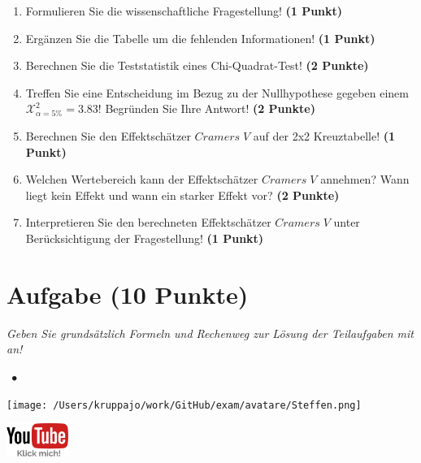 \documentclass[a4paper, 9pt]{scrartcl}\usepackage[]{graphicx}\usepackage[]{xcolor}
\begin{document}
\begin{enumerate}
\item Formulieren Sie die wissenschaftliche Fragestellung! \textbf{(1 Punkt)}
\item Ergänzen Sie die Tabelle um die fehlenden Informationen! \textbf{(1 Punkt)} 
\item Berechnen Sie die Teststatistik eines Chi-Quadrat-Test! \textbf{(2 Punkte)}
\item Treffen Sie eine Entscheidung im Bezug zu der Nullhypothese gegeben
  einem $\mathcal{X}^2_{\alpha = 5\%} = 3.83$! Begründen Sie Ihre Antwort!
  \textbf{(2 Punkte)}
\item Berechnen Sie den Effektschätzer $Cramers\; V$ auf der 2x2 Kreuztabelle! \textbf{(1 Punkt)}
\item Welchen Wertebereich kann der Effektschätzer $Cramers\; V$ annehmen? Wann liegt kein Effekt und wann ein starker Effekt vor? \textbf{(2 Punkte)}
\item Interpretieren Sie den berechneten Effektschätzer $Cramers\; V$ unter Berücksichtigung der Fragestellung! \textbf{(1 Punkt)}
\end{enumerate} 
\clearpage

\section{Aufgabe \hfill (10 Punkte)}

\textit{Geben Sie grundsätzlich Formeln und Rechenweg zur Lösung der Teilaufgaben mit an!} \\[1Ex]
 

 
\ifcollection
\begin{flushright}
\tiny\vspace{-3Ex}
\textbf{\examinhaltstart}
\exammodulestat $\;\bullet$
\exammodulestatbbv
\vspace{-4Ex}
\end{flushright}
\begin{minipage}[t]{0.5\textwidth}
\texttt{[image: /Users/kruppajo/work/GitHub/exam/avatare/Steffen.png]}
\end{minipage}
\begin{minipage}[t]{0.5\textwidth}
\hfill
\href{https://youtu.be/jakM7fHyZfU}{\includegraphics[width = 2cm]{img/youtube}}
\end{minipage}
\vspace{-3Ex}
\fi
\end{document}
